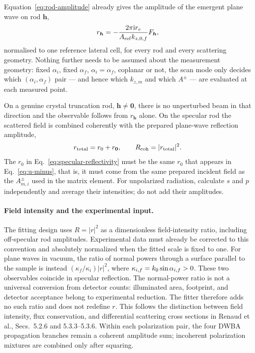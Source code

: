 Equation~\eqref{eq:rod-amplitude} already gives the amplitude of the emergent
plane wave on rod $\bm h$,
\[
  r_{\bm h}=-\frac{2\pi\mathrm{i} r_e}{A_{\rm ref}k_{z,0,f}}F_{\bm h},
\]
normalised to one reference lateral cell, for every rod and every scattering
geometry.  Nothing further needs to be assumed about the measurement geometry:
fixed $\alpha_i$, fixed $\alpha_f$, $\alpha_i=\alpha_f$, coplanar or not, the
scan mode only decides which $(\alpha_i,\alpha_f)$ pair --- and hence which
$k_{z,m}$ and which $A^\pm$ --- are evaluated at each measured point.

On a genuine crystal truncation rod, $\bm h\neq\bm 0$, there is no unperturbed
beam in that direction and the observable follows from $r_{\bm h}$ alone.  On
the specular rod the scattered field is combined coherently with the prepared
plane-wave reflection amplitude,
\begin{equation}
  r_{\rm total}=r_0+r_{\bm 0},
  \qquad
  R_{\rm coh}=|r_{\rm total}|^2.
  \label{eq:specular-reflectivity}
\end{equation}
The $r_0$ in Eq.~\eqref{eq:specular-reflectivity} must be the same $r_0$ that
appears in Eq.~\eqref{eq:u-minus}, that is, it must come from the same prepared
incident field as the $A_{m,i}^{\pm}$ used in the matrix element.  For
unpolarized radiation, calculate $s$ and $p$ independently and average their
intensities; do not add their amplitudes.

\paragraph{Field intensity and the experimental input.}
The fitting design uses $R=|r|^2$ as a dimensionless field-intensity ratio,
including off-specular rod amplitudes.  Experimental data must already be
corrected to this convention and absolutely normalized when the fitted scale
is fixed to one.  For plane waves in vacuum, the ratio of normal powers
through a surface parallel to the sample is instead
$(\kappa_f/\kappa_i)|r|^2$, where
$\kappa_{i,f}=k_0\sin\alpha_{i,f}>0$.  These two observables coincide in
specular reflection.  The normal-power ratio is not a universal conversion
from detector counts: illuminated area, footprint, and detector acceptance
belong to experimental reduction.  The fitter therefore adds no such ratio
and does not redefine $r$.  This follows the distinction between field
intensity, flux conservation, and differential scattering cross sections in
Renaud et al., Secs.~5.2.6 and 5.3.3--5.3.6.  Within each polarization pair,
the four DWBA propagation branches remain a coherent amplitude sum;
incoherent polarization mixtures are combined only after squaring.


